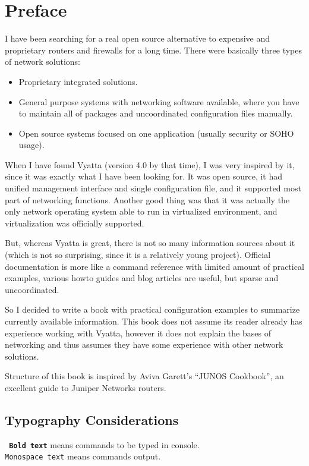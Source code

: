 \chapter*{Preface}
I have been searching for a real open source alternative to expensive and proprietary routers and firewalls for a long time. There were basically three types of network solutions:
\begin{itemize}
 \item Proprietary integrated solutions.
 \item General purpose systems with networking software available, where you have to maintain all of packages and
 uncoordinated configuration files manually.
 \item Open source systems focused on one application (usually security or SOHO usage).
\end{itemize}
When I have found Vyatta (version 4.0 by that time), I was very inspired by it, since it was exactly what I have been
looking for. It was open source, it had unified management interface and single configuration file, and it supported 
most part of networking functions. Another good thing was that it was actually the only network operating system able to run in virtualized environment, and virtualization was officially supported.

But, whereas Vyatta is great, there is not so many information sources about it (which is not so surprising, since it is a relatively young project). Official documentation is more like a command reference with limited amount of practical examples, various howto guides and blog articles are useful, but sparse and uncoordinated.

So I decided to write a book with practical configuration examples to summarize currently available information. This book does not assume its reader already has experience working with Vyatta, however it does not explain the bases of networking and thus assumes they have some experience with other network solutions.

Structure of this book is inspired by Aviva Garett's ``JUNOS Cookbook'', an excellent guide to Juniper Networks routers.

\section*{Typography Considerations}
{\tt{ \bf Bold text}} means commands to be typed in console. \\
\texttt{Monospace text} means commands output.
